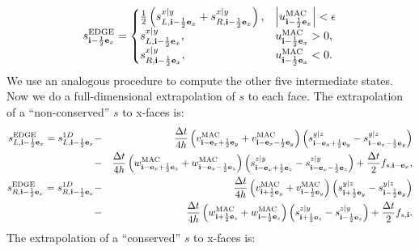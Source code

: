 \begin{equation}
s_{{\bf i}-\frac{1}{2}{\bf e}_x}^{\rm EDGE} =
\begin{cases}
\frac{1}{2}\left(s_{L,{\bf i}-\frac{1}{2}{\bf e}_x}^{x|y} + s_{R,{\bf i}-\frac{1}{2}{\bf e}_x}^{x|y}\right), & \left|u^{\rm MAC}_{{\bf i}-\frac{1}{2}{\bf e}_x}\right| < \epsilon \\
s_{L,{\bf i}-\frac{1}{2}{\bf e}_x}^{x|y}, & u^{\rm MAC}_{{\bf i}-\frac{1}{2}{\bf e}_x} > 0, \\
s_{R,{\bf i}-\frac{1}{2}{\bf e}_x}^{x|y}, & u^{\rm MAC}_{{\bf i}-\frac{1}{2}{\bf e}_x} < 0.
\end{cases}
\end{equation}
We use an analogous procedure to compute the other five intermediate
states.  Now we do a full-dimensional extrapolation of $s$ to each
face.  The extrapolation of a ``non-conserved'' $s$ to x-faces is:
\begin{eqnarray}
s_{L,{\bf i}-\frac{1}{2}{\bf e}_x}^{\rm EDGE} = s_{L,{\bf i}-\frac{1}{2}{\bf e}_x}^{1D} &-& \frac{\Delta t}{4h}\left(v_{{\bf i}-{\bf e}_x+\frac{1}{2}{\bf e}_y}^{\rm MAC}+v_{{\bf i}-{\bf e}_x-\frac{1}{2}{\bf e}_y}^{\rm MAC}\right)\left(s_{{\bf i}-{\bf e}_x+\frac{1}{2}{\bf e}_y}^{y|z}-s_{{\bf i}-{\bf e}_x-\frac{1}{2}{\bf e}_y}^{y|z}\right) \nonumber \\
&-& \frac{\Delta t}{4h}\left(w_{{\bf i}-{\bf e}_x+\frac{1}{2}{\bf e}_z}^{\rm MAC}+w_{{\bf i}-{\bf e}_x-\frac{1}{2}{\bf e}_z}^{\rm MAC}\right)\left(s_{{\bf i}-{\bf e}_x+\frac{1}{2}{\bf e}_z}^{z|y}-s_{{\bf i}-{\bf e}_x-\frac{1}{2}{\bf e}_z}^{z|y}\right) + \frac{\Delta t}{2}f_{s,{\bf i}-{\bf e}_x}, \\
s_{R,{\bf i}-\frac{1}{2}{\bf e}_x}^{\rm EDGE} = s_{R,{\bf i}-\frac{1}{2}{\bf e}_x}^{1D} &-& \frac{\Delta t}{4h}\left(v_{{\bf i}+\frac{1}{2}{\bf e}_y}^{\rm MAC}+v_{{\bf i}-\frac{1}{2}{\bf e}_y}^{\rm MAC}\right)\left(s_{{\bf i}+\frac{1}{2}{\bf e}_y}^{y|z}-s_{{\bf i}-\frac{1}{2}{\bf e}_y}^{y|z}\right) \nonumber \\
&-& \frac{\Delta t}{4h}\left(w_{{\bf i}+\frac{1}{2}{\bf e}_z}^{\rm MAC}+w_{{\bf i}-\frac{1}{2}{\bf e}_z}^{\rm MAC}\right)\left(s_{{\bf i}+\frac{1}{2}{\bf e}_z}^{z|y}-s_{{\bf i}-\frac{1}{2}{\bf e}_z}^{z|y}\right) + \frac{\Delta t}{2}f_{s,{\bf i}}.
\end{eqnarray}
The extrapolation of a ``conserved'' $s$ to x-faces is:
